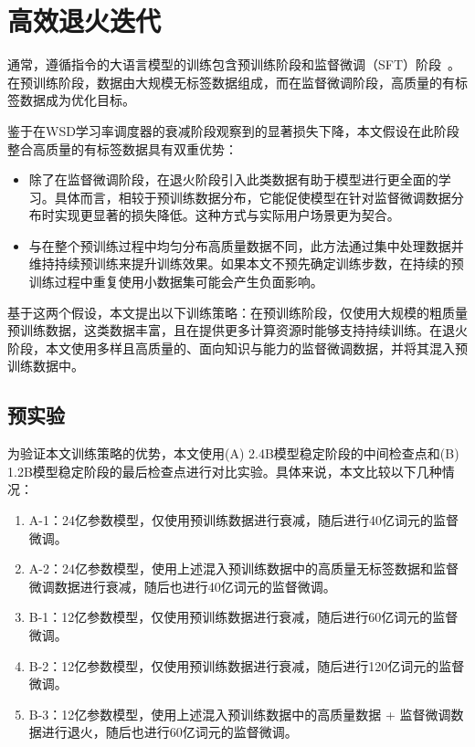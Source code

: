 

\section{高效退火迭代}
\label{sec:trainingstrategy}
通常，遵循指令的大语言模型的训练包含预训练阶段和监督微调（SFT）阶段~\citep{zhang2023instruction,wei2021finetuned}。在预训练阶段，数据由大规模无标签数据组成，而在监督微调阶段，高质量的有标签数据成为优化目标。

鉴于在WSD学习率调度器的衰减阶段观察到的显著损失下降，本文假设在此阶段整合高质量的有标签数据具有双重优势：
\begin{itemize}
    \item 除了在监督微调阶段，在退火阶段引入此类数据有助于模型进行更全面的学习。具体而言，相较于预训练数据分布，它能促使模型在针对监督微调数据分布时实现更显著的损失降低。这种方式与实际用户场景更为契合。
    \item 与在整个预训练过程中均匀分布高质量数据不同，此方法通过集中处理数据并维持持续预训练来提升训练效果。如果本文不预先确定训练步数，在持续的预训练过程中重复使用小数据集可能会产生负面影响。
\end{itemize}

基于这两个假设，本文提出以下训练策略：在预训练阶段，仅使用大规模的粗质量预训练数据，这类数据丰富，且在提供更多计算资源时能够支持持续训练。在退火阶段，本文使用多样且高质量的、面向知识与能力的监督微调数据，并将其混入预训练数据中。

\subsection{预实验}
为验证本文训练策略的优势，本文使用(A) 2.4B模型稳定阶段的中间检查点和(B) 1.2B模型稳定阶段的最后检查点进行对比实验。具体来说，本文比较以下几种情况：

\begin{enumerate}
    \item A-1：24亿参数模型，仅使用预训练数据进行衰减，随后进行40亿词元的监督微调。
    \item A-2：24亿参数模型，使用上述混入预训练数据中的高质量无标签数据和监督微调数据进行衰减，随后也进行40亿词元的监督微调。
    \item B-1：12亿参数模型，仅使用预训练数据进行衰减，随后进行60亿词元的监督微调。
    \item B-2：12亿参数模型，仅使用预训练数据进行衰减，随后进行120亿词元的监督微调。
    \item B-3：12亿参数模型，使用上述混入预训练数据中的高质量数据 + 监督微调数据进行退火，随后也进行60亿词元的监督微调。 
\end{enumerate}

